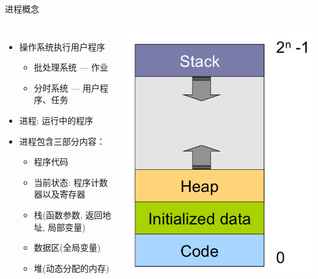 \documentclass[xcolor=svgnames]{beamer}
\begin{document}
\begin{CJK*}{UTF8}{gbsn}
\begin{frame}{进程概念}
\begin{columns}
\begin{itemize}
\item 操作系统执行用户程序
\begin{itemize}
\item 批处理系统 --- 作业
\item 分时系统 --- 用户程序、任务
\end{itemize}
\item 进程: 运行中的程序 
\item 进程包含三部分内容：
\begin{itemize}
\item 程序代码
\item 当前状态: 程序计数器以及寄存器
\item 栈(函数参数, 返回地址, 局部变量)
\item 数据区(全局变量)
\item 堆(动态分配的内存)
\end{itemize}
\end{itemize}
\includegraphics[width=1.0\textwidth]{memory.png}
\end{columns}
\end{frame}


\end{CJK*}
\end{document}

